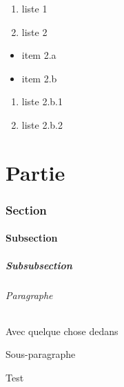 \documentclass{article}
\begin{document}
			

			\begin{enumerate}
				\item liste 1
				\item liste 2
			\end{enumerate}

			\begin{itemize}[label=$\bullet$]
				\item item 2.a
				\item item 2.b
			\end{itemize}

			\begin{enumerate}
				\item liste 2.b.1
				\item liste 2.b.2
			\end{enumerate}

			

	\part{Partie}

		\section{Section}

			\subsection{Subsection}

				\subsubsection{Subsubsection}

					\paragraph{Paragraphe}%
						Avec quelque chose dedans

						\subparagraph{Sous-paragraphe}%
							Test
\end{document}
